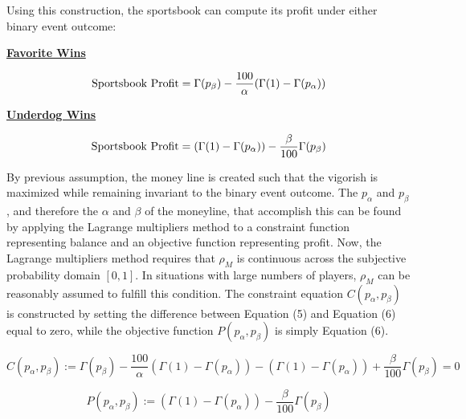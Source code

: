 \documentclass[sn-mathphys-num]{sn-jnl}
\theoremstyle{thmstyleone}%
\theoremstyle{thmstyletwo}%
\theoremstyle{thmstylethree}%
\begin{document}
Using this construction, the sportsbook can compute its profit under either binary event outcome: 

\begin{center}
\underline{\textbf{Favorite Wins}}
\end{center}

\begin{equation}
\textnormal{Sportsbook Profit} = \Gamma(p_\beta)-\frac{100}{\alpha}(\Gamma(1)-\Gamma(p_\alpha)) 
\end{equation}
\vspace{.05in}

\begin{center}
\underline{\textbf{Underdog Wins}}
\end{center}

\begin{equation}
\textnormal{Sportsbook Profit} =  (\Gamma(1)-\Gamma(p_\alpha)) - \frac{\beta}{100} \Gamma(p_\beta)
\end{equation}
\vspace{.05in}

By previous assumption, the money line is created such that the vigorish is maximized while remaining invariant to the binary event outcome. The $p_\alpha$ and $p_\beta$, and therefore the $\alpha$ and $\beta$ of the moneyline, that accomplish this can be found by applying the Lagrange multipliers method to a constraint function representing balance and an objective function representing profit. Now, the Lagrange multipliers method requires that $\rho_M$ is continuous across the subjective probability domain $[0,1]$. In situations with large numbers of players, $\rho_M$ can be reasonably assumed to fulfill this condition. The constraint equation $C(p_\alpha,p_\beta)$ is constructed by setting the difference between Equation (5) and Equation (6) equal to zero, while the objective function $P(p_\alpha,p_\beta)$ is simply Equation (6).

\begin{equation}
C(p_\alpha,p_\beta) := \Gamma(p_\beta) - \frac{100}{\alpha}(\Gamma(1)-\Gamma(p_\alpha)) - (\Gamma(1)-\Gamma(p_\alpha)) + \frac{\beta}{100}\Gamma(p_\beta) = 0
\end{equation}

\begin{equation}
P(p_\alpha,p_\beta) := (\Gamma(1)-\Gamma(p_\alpha)) - \frac{\beta}{100}\Gamma(p_\beta)
\end{equation}
\vspace{.05in}
\end{document}
